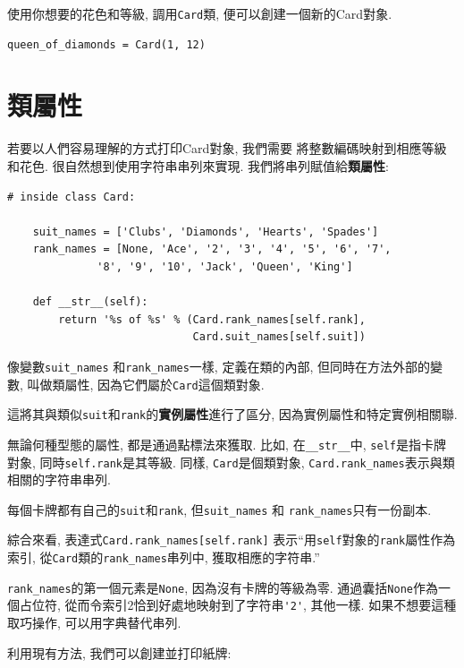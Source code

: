 \documentclass[10pt]{book}
\begin{document}
使用你想要的花色和等級, 調用{\tt Card}類, 便可以創建一個新的Card對象. 

\begin{verbatim}
queen_of_diamonds = Card(1, 12)
\end{verbatim}
%


\section{類屬性}
\label{class.attribute}

若要以人們容易理解的方式打印Card對象, 我們需要
將整數編碼映射到相應等級和花色. 
很自然想到使用字符串串列來實現. 
我們將串列賦值給{\bf 類屬性}:

\begin{verbatim}
# inside class Card:

    suit_names = ['Clubs', 'Diamonds', 'Hearts', 'Spades']
    rank_names = [None, 'Ace', '2', '3', '4', '5', '6', '7', 
              '8', '9', '10', 'Jack', 'Queen', 'King']

    def __str__(self):
        return '%s of %s' % (Card.rank_names[self.rank],
                             Card.suit_names[self.suit])
\end{verbatim}
%
像變數\verb"suit_names" 和\verb"rank_names"一樣, 
定義在類的內部, 但同時在方法外部的變數, 叫做類屬性, 
因為它們屬於{\tt Card}這個類對象. 

這將其與類似{\tt suit}和{\tt rank}的{\bf 實例屬性}進行了區分, 
因為實例屬性和特定實例相關聯. 

無論何種型態的屬性, 都是通過點標法來獲取. 
比如, 在\verb"__str__"中, {\tt self}是指卡牌對象, 
同時{\tt self.rank}是其等級. 同樣, {\tt Card}是個類對象, 
\verb"Card.rank_names"表示與類相關的字符串串列. 

每個卡牌都有自己的{\tt suit}和{\tt rank}, 
但\verb"suit_names" 和 \verb"rank_names"只有一份副本. 

綜合來看, 表達式\verb"Card.rank_names[self.rank]" 
表示``用{\tt self}對象的{\tt rank}屬性作為索引, 
從{\tt Card}類的\verb"rank_names"串列中, 獲取相應的字符串.''

\verb"rank_names"的第一個元素是{\tt None},
因為沒有卡牌的等級為零. 
通過囊括{\tt None}作為一個占位符, 
從而令索引2恰到好處地映射到了字符串\verb"'2'", 其他一樣. 
如果不想要這種取巧操作, 可以用字典替代串列. 

利用現有方法, 我們可以創建並打印紙牌:
\end{document}
